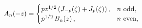 \[\mathop{A_{n}\/}\nolimits\!\left(-z\right)=\begin{cases}pz^{1/2}\left(\mathop{%
J_{-p}\/}\nolimits\!\left(\zeta\right)+\mathop{J_{p}\/}\nolimits\!\left(\zeta%
\right)\right),&n\text{ odd},\\
p^{1/2}\mathop{B_{n}\/}\nolimits\!\left(z\right),&n\text{ even},\end{cases}\]